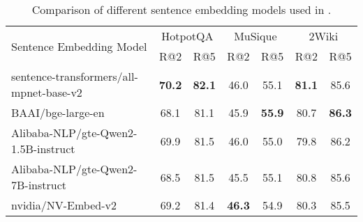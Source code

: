 \begin{table}[]
    \centering
    \caption{Comparison of different sentence embedding models used in \ourmethod.}
    \label{tab:text-emb}
    \begin{tabular}{@{}l|cc|cc|cc@{}}
    \toprule
    \multirow{2}{*}{Sentence Embedding Model} & \multicolumn{2}{c|}{HotpotQA} & \multicolumn{2}{c|}{MuSique}  & \multicolumn{2}{c}{2Wiki}     \\ \cmidrule(l){2-7} 
                                              & R@2           & R@5           & R@2           & R@5           & R@2           & R@5           \\ \midrule
    sentence-transformers/all-mpnet-base-v2   & \textbf{70.2} & \textbf{82.1} & 46.0 & 55.1 & \textbf{81.1} & 85.6 \\
    BAAI/bge-large-en                         & 68.1          & 81.1          & 45.9          &  \textbf{55.9}          & 80.7          & \textbf{86.3}          \\
    Alibaba-NLP/gte-Qwen2-1.5B-instruct       & 69.9          & 81.5          & 46.0          & 55.0          & 79.8          & 86.2          \\
    Alibaba-NLP/gte-Qwen2-7B-instruct         & 68.5          & 81.5          & 45.5          & 55.1          & 80.8          & 85.6          \\
    nvidia/NV-Embed-v2                        & 69.2          & 81.4          & \textbf{46.3}          & 54.9          & 80.3          & 85.5          \\ \bottomrule
    \end{tabular}%
    \end{table}